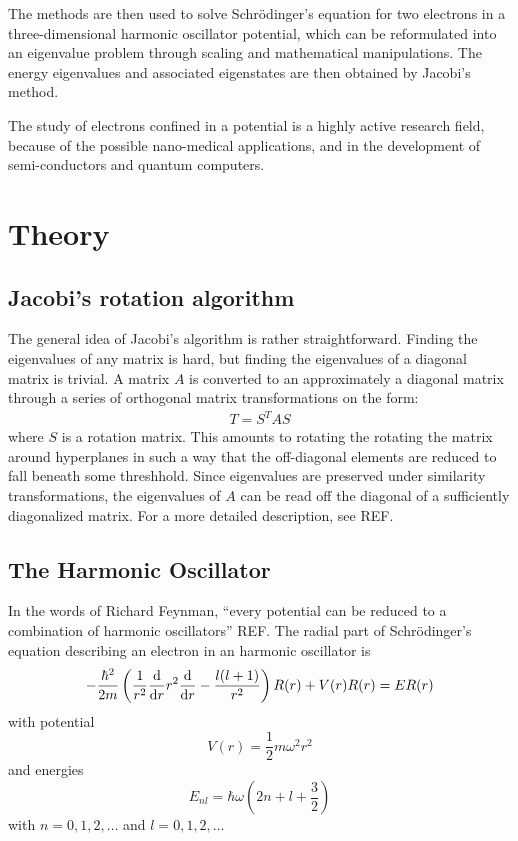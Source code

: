 \documentclass[aps,reprint]{revtex4-1}
\begin{document}
The methods are then used to solve Schrödinger's equation for two electrons in a
three-dimensional harmonic oscillator potential, which can be reformulated into
an eigenvalue problem through scaling and mathematical manipulations. The
energy eigenvalues and associated eigenstates are then obtained by Jacobi's method.

The study of electrons confined in a potential is a highly active research field,
because of the possible nano-medical applications, and in the development of semi-conductors
and quantum computers.
\section{Theory}
\label{sec:theory}
\subsection{Jacobi's rotation algorithm}
The general idea of Jacobi's algorithm is rather straightforward. Finding the
eigenvalues of any matrix is hard, but finding the eigenvalues of a diagonal
matrix is trivial. A matrix \(A\) is converted to an approximately a diagonal
matrix through a series of orthogonal matrix transformations on the form:
\begin{align*}
  T = S^T A S
\end{align*}
where $S$ is a rotation matrix. This amounts to rotating the rotating the matrix
around hyperplanes in such a way that the off-diagonal elements are reduced to
fall beneath some threshhold.
Since eigenvalues are preserved under similarity
transformations, the eigenvalues of \(A\) can be read off the diagonal of a
sufficiently diagonalized matrix. For a more detailed description, see REF.

\subsection{The Harmonic Oscillator}
\label{sec:harmonic}
In the words of Richard Feynman, ``every potential can be reduced to a
combination of harmonic oscillators'' REF. The radial part of Schrödinger's
equation describing an electron in an harmonic oscillator is
\begin{equation}
  \label{eq:schroedinger}
  -\frac{\hbar^{2}}{2m} \left( \frac{1}{r^{2}}\dv{r}r^{2}\dv{r} - \frac{l(l+1)}{r^{2}} \right)R(r) + V(r)R(r) = ER(r)
\end{equation}
with potential
\begin{equation*}
  V(r) = \frac{1}{2}mω^{2}r^{2}
\end{equation*}
and energies
\begin{equation*}
  E_{nl} = \hbar\omega\left( 2n+l+\frac{3}{2} \right)
\end{equation*}
with \(n=0,1,2,\ldots\) and \(l = 0,1,2,\ldots\)
\end{document}
